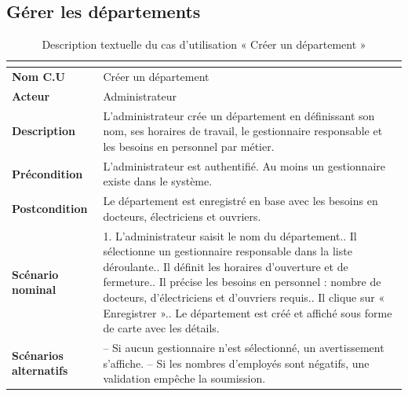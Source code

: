
\subsection{Gérer les départements}

\begin{table}[H]
  \centering
  \caption{Description textuelle du cas d'utilisation « Créer un département »}
  \label{tab:cu_departments}
  \renewcommand{\arraystretch}{1.4}
  \begin{tabularx}{\textwidth}{|>{\bfseries}l|L|}
    \hline
     \\
    \hline
    Nom C.U & Créer un département \\
    \hline
    Acteur & Administrateur \\
    \hline
    Description & L'administrateur crée un département en définissant son nom, ses horaires
      de travail, le gestionnaire responsable et les besoins en personnel par métier. \\
    \hline
    Précondition & L'administrateur est authentifié. Au moins un gestionnaire existe
      dans le système. \\
    \hline
    Postcondition & Le département est enregistré en base avec les besoins en docteurs,
      électriciens et ouvriers. \\
    \hline
    Scénario nominal &
      1. L'administrateur saisit le nom du département.. Il sélectionne un gestionnaire responsable dans la liste déroulante.. Il définit les horaires d'ouverture et de fermeture.. Il précise les besoins en personnel : nombre de docteurs, d'électriciens et d'ouvriers requis.. Il clique sur « Enregistrer ».. Le département est créé et affiché sous forme de carte avec les détails. \\
    \hline
    Scénarios alternatifs &
      -- Si aucun gestionnaire n'est sélectionné, un avertissement s'affiche.\newline
      -- Si les nombres d'employés sont négatifs, une validation empêche la soumission. \\
    \hline
  \end{tabularx}
\end{table}

